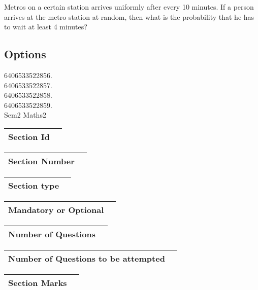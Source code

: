 \documentclass{article}
\begin{document}
Metros on a certain station arrives uniformly after every 10 minutes. If a person arrives at the 
metro station at random, then what is the probability that he has to wait at least 4 minutes?\\

\subsection{Options }

6406533522856.\\

6406533522857.\\

6406533522858.\\

6406533522859.\\

Sem2 Maths2\\

\begin{longtable}{|c|c|}
\hline
\textbf{Section Id} & \textbf{} \\ \hline
\end{longtable}

\begin{longtable}{|c|c|}
\hline
\textbf{Section Number} & \textbf{} \\ \hline
\end{longtable}

\begin{longtable}{|c|c|}
\hline
\textbf{Section type} & \textbf{} \\ \hline
\end{longtable}

\begin{longtable}{|c|c|}
\hline
\textbf{Mandatory or Optional} & \textbf{} \\ \hline
\end{longtable}

\begin{longtable}{|c|c|}
\hline
\textbf{Number of Questions} & \textbf{} \\ \hline
\end{longtable}

\begin{longtable}{|c|c|}
\hline
\textbf{Number of Questions to be attempted} & \textbf{} \\ \hline
\end{longtable}

\begin{longtable}{|c|c|}
\hline
\textbf{Section Marks} & \textbf{} \\ \hline
\end{longtable}
\end{document}
